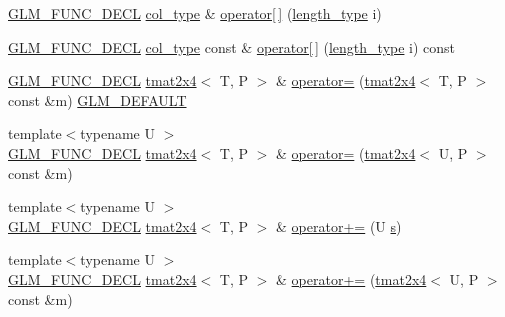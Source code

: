 \begin{DoxyCompactItemize}
\item 
\mbox{\hyperlink{setup_8hpp_ab2d052de21a70539923e9bcbf6e83a51}{G\+L\+M\+\_\+\+F\+U\+N\+C\+\_\+\+D\+E\+CL}} \mbox{\hyperlink{structglm_1_1tmat2x4_a9effcccd2c4c50c385e4c3a2fe2feedb}{col\+\_\+type}} \& \mbox{\hyperlink{structglm_1_1tmat2x4_a2bc91eaefd3d2fb68c70a5c0266f7be3}{operator\mbox{[}$\,$\mbox{]}}} (\mbox{\hyperlink{structglm_1_1tmat2x4_a8d8156b982138c22047082ca7a8f9009}{length\+\_\+type}} i)
\item 
\mbox{\hyperlink{setup_8hpp_ab2d052de21a70539923e9bcbf6e83a51}{G\+L\+M\+\_\+\+F\+U\+N\+C\+\_\+\+D\+E\+CL}} \mbox{\hyperlink{structglm_1_1tmat2x4_a9effcccd2c4c50c385e4c3a2fe2feedb}{col\+\_\+type}} const  \& \mbox{\hyperlink{structglm_1_1tmat2x4_a67d9d9d46fd65a05c4752da243faea64}{operator\mbox{[}$\,$\mbox{]}}} (\mbox{\hyperlink{structglm_1_1tmat2x4_a8d8156b982138c22047082ca7a8f9009}{length\+\_\+type}} i) const
\item 
\mbox{\hyperlink{setup_8hpp_ab2d052de21a70539923e9bcbf6e83a51}{G\+L\+M\+\_\+\+F\+U\+N\+C\+\_\+\+D\+E\+CL}} \mbox{\hyperlink{structglm_1_1tmat2x4}{tmat2x4}}$<$ T, P $>$ \& \mbox{\hyperlink{structglm_1_1tmat2x4_a6b28f8306b71c409138050173a41dc7e}{operator=}} (\mbox{\hyperlink{structglm_1_1tmat2x4}{tmat2x4}}$<$ T, P $>$ const \&m) \mbox{\hyperlink{setup_8hpp_aefce7051c376a64ba89fa93a9f63bc2c}{G\+L\+M\+\_\+\+D\+E\+F\+A\+U\+LT}}
\item 
{\footnotesize template$<$typename U $>$ }\\\mbox{\hyperlink{setup_8hpp_ab2d052de21a70539923e9bcbf6e83a51}{G\+L\+M\+\_\+\+F\+U\+N\+C\+\_\+\+D\+E\+CL}} \mbox{\hyperlink{structglm_1_1tmat2x4}{tmat2x4}}$<$ T, P $>$ \& \mbox{\hyperlink{structglm_1_1tmat2x4_abec672d9eb6e8a3a6bdb0ffe46b1f3c7}{operator=}} (\mbox{\hyperlink{structglm_1_1tmat2x4}{tmat2x4}}$<$ U, P $>$ const \&m)
\item 
{\footnotesize template$<$typename U $>$ }\\\mbox{\hyperlink{setup_8hpp_ab2d052de21a70539923e9bcbf6e83a51}{G\+L\+M\+\_\+\+F\+U\+N\+C\+\_\+\+D\+E\+CL}} \mbox{\hyperlink{structglm_1_1tmat2x4}{tmat2x4}}$<$ T, P $>$ \& \mbox{\hyperlink{structglm_1_1tmat2x4_a9df37229e9c50f1022701ffc52dcd1d2}{operator+=}} (U \mbox{\hyperlink{glad_8h_af1b1d5edfea6a34daee7389b1b5810ad}{s}})
\item 
{\footnotesize template$<$typename U $>$ }\\\mbox{\hyperlink{setup_8hpp_ab2d052de21a70539923e9bcbf6e83a51}{G\+L\+M\+\_\+\+F\+U\+N\+C\+\_\+\+D\+E\+CL}} \mbox{\hyperlink{structglm_1_1tmat2x4}{tmat2x4}}$<$ T, P $>$ \& \mbox{\hyperlink{structglm_1_1tmat2x4_a3fb9f1795e6f87a9822678ffcd1f6d9d}{operator+=}} (\mbox{\hyperlink{structglm_1_1tmat2x4}{tmat2x4}}$<$ U, P $>$ const \&m)

\end{DoxyCompactItemize}
